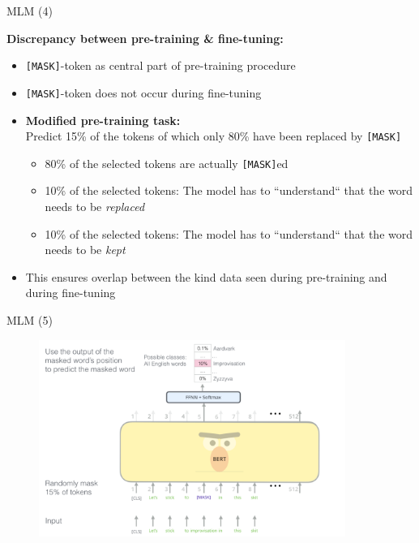 \begin{frame}{MLM (4)}

\vfill

\textbf{Discrepancy between pre-training \& fine-tuning:}

\begin{itemize}
	\item \texttt{[MASK]}-token as central part of pre-training procedure
	\item \texttt{[MASK]}-token does not occur during fine-tuning
	\item \textbf{Modified pre-training task:}\\
				Predict 15\% of the tokens of which only 80\% have been replaced by \texttt{[MASK]}
				\begin{itemize}
					\item 80\% of the selected tokens are actually \texttt{[MASK]}ed
					\item 10\% of the selected tokens: The model has to ``understand`` that the word needs to be \textit{replaced}
					\item 10\% of the selected tokens: The model has to ``understand`` that the word needs to be \textit{kept}
			\end{itemize}
	\item This ensures overlap between the kind data seen during pre-training and during fine-tuning
\end{itemize}
	
\vfill

\end{frame}


\begin{frame}{MLM (5)}

\vfill

	\begin{figure}
		\centering
		\includegraphics[width = 10cm]{figure/bert-mlm.png}\\ 
	\end{figure}

\vfill

\end{frame}

